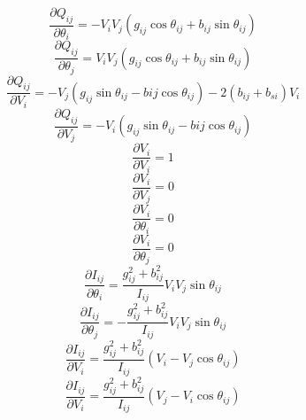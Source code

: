 \documentclass[12pt]{article}
\begin{document}
\begin{equation}
\frac{\partial Q_{ij}}{\partial \theta_i}  = -V_iV_j(g_{ij}\cos\theta_{ij} + b_{ij}\sin{\theta_{ij}})
\end{equation}
\begin{equation}
\frac{\partial Q_{ij}}{\partial \theta_j}  = V_iV_j(g_{ij}\cos\theta_{ij} + b_{ij}\sin{\theta_{ij}})
\end{equation}
\begin{equation}
\frac{\partial Q_{ij}}{\partial V_i}  =-V_j(g_{ij}\sin\theta_{ij}-b{ij}\cos{\theta_{ij}})-2(b_{ij}+b_{si})V_i
\end{equation}
\begin{equation}
\frac{\partial Q_{ij}}{\partial V_j}  =-V_i(g_{ij}\sin\theta_{ij}-b{ij}\cos{\theta_{ij}})
\end{equation}
\begin{equation}
\frac{\partial V_i}{\partial V_i}  = 1
\end{equation}
\begin{equation}
\frac{\partial V_i}{\partial V_j}  = 0
\end{equation}
\begin{equation}
\frac{\partial V_i}{\partial \theta_i}  = 0
\end{equation}
\begin{equation}
\frac{\partial V_i}{\partial \theta_j}  = 0
\end{equation}
\begin{equation}
\frac{\partial I_{ij}}{\partial \theta_i}  = \frac{g_{ij}^2+b_{ij}^2}{I_{ij}}V_iV_j\sin{\theta_{ij}} 
\end{equation}
\begin{equation}
\frac{\partial I_{ij}}{\partial \theta_j}  = -\frac{g_{ij}^2+b_{ij}^2}{I_{ij}}V_iV_j\sin{\theta_{ij}}
\end{equation}
\begin{equation}
\frac{\partial I_{ij}}{\partial V_i}  = \frac{g_{ij}^2+b_{ij}^2}{I_{ij}}(V_i-V_j\cos{\theta_{ij}})
\end{equation}
\begin{equation}
\frac{\partial I_{ij}}{\partial V_i}  = \frac{g_{ij}^2+b_{ij}^2}{I_{ij}}(V_j-V_i\cos{\theta_{ij}})
\end{equation}
\end{document}
